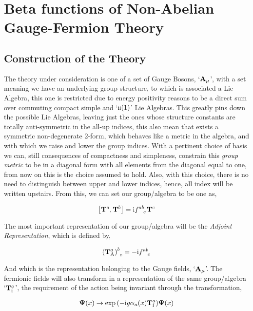 \section{Beta functions of Non-Abelian Gauge-Fermion Theory}

\subsection{Construction of the Theory}

The theory under consideration is one of a set of Gauge Bosons, `${\vb A}_\mu$', with a set meaning we have an underlying group structure, to which is associated a Lie Algebra, this one is restricted due to energy positivity reasons to be a direct sum over commuting compact simple and `$\mathfrak u\qty(1)$' Lie Algebras. This greatly pins down the possible Lie Algebras, leaving just the ones whose structure constants are totally anti-symmetric in the all-up indices, this also mean that exists a symmetric non-degenerate 2-form, which behaves like a metric in the algebra, and with which we raise and lower the group indices. With a pertinent choice of basis we can, still consequences of compactness and simpleness, constrain this \textit{group metric} to be in a diagonal form with all elements from the diagonal equal to one, from now on this is the choice assumed to hold. Also, with this choice, there is no need to distinguish between upper and lower indices, hence, all index will be written upstairs. From this, we can set our group/algebra to be one as,

\begin{align}
    \comm{\vb T^a}{\vb T^b}=\im\tensor{f}{^a^b_c}\vb T^c\nonumber
\end{align}

The most important representation of our group/algebra will be the \textit{Adjoint Representation}, which is defined by,

\begin{align}
    \tensor{{\qty(\vb T_{\textnormal A}^{a})}}{^b_c}=-\im \tensor{f}{^a^b_c}\nonumber
\end{align}

And which is the representation belonging to the Gauge fields, `${\vb A}_\mu$'. The fermionic fields will also transform in a representation of the same group/algebra `$\vb T^a_{\textnormal f}$', the requirement of the action being invariant through the transformation,

\begin{align}
    \boldsymbol\Psi\qty(x)\rightarrow\exp\qty(-\textnormal{i} g \alpha_a\qty(x)\vb T^a_{\textnormal f})\boldsymbol\Psi\qty(x)\nonumber
\end{align}

